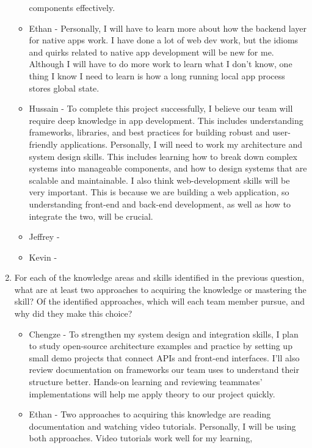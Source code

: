 \begin{enumerate}
\begin{itemize}
        components effectively.
        \item Ethan - Personally, I will have to learn more about how the
          backend layer for native apps work. I have done a lot of web dev
          work, but the idioms and quirks related to native app development
          will be new for me. Although I will have to do more work to learn
          what I don't know, one thing I know I need to learn is how a long
          running local app process stores global state.
        \item Hussain - To complete this project successfully, I believe our
        team will require deep knowledge in app development. This includes
        understanding frameworks, libraries, and best practices for building
        robust and user-friendly applications. Personally, I will need to work
        my architecture and system design skills. This includes learning how to
        break down complex systems into manageable components, and how to
        design systems that are scalable and maintainable. I also think 
        web-development skills will be very important. This is because we are
        building a web application, so understanding front-end and back-end
        development, as well as how to integrate the two, will be crucial.
        \item Jeffrey - 
        \item Kevin - 
  \end{itemize} 
  \item For each of the knowledge areas and skills identified in the previous
  question, what are at least two approaches to acquiring the knowledge or
  mastering the skill?  Of the identified approaches, which will each team
  member pursue, and why did they make this choice?
  \begin{itemize}
        \item Chengze - To strengthen my system design and integration skills, 
        I plan to study open-source architecture examples and practice by setting 
        up small demo projects that connect APIs and front-end interfaces. I’ll also 
        review documentation on frameworks our team uses to understand their structure 
        better. Hands-on learning and reviewing teammates’ implementations will help 
        me apply theory to our project quickly.
        \item Ethan - Two approaches to acquiring this knowledge are reading
          documentation and watching video tutorials. Personally, I will be
          using both approaches. Video tutorials work well for my learning,

\end{itemize}
\end{enumerate}
